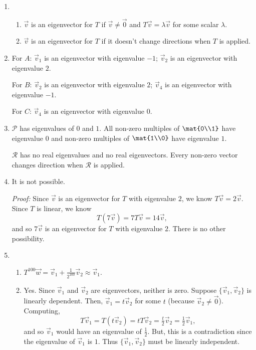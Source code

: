 		\begin{enumerate}
			\item \begin{enumerate}
					\item $\vec v$ is an eigenvector for $T$ if $\vec v\neq \vec 0$ and
						$T\vec v=\lambda \vec v$ for some scalar $\lambda$.
					\item $\vec v$ is an eigenvector for $T$ if it doesn't change directions
						when $T$ is applied.
			\end{enumerate}
			\item
				For $A$:
				$\vec v_1$ is an eigenvector with eigenvalue $-1$;
				$\vec v_2$ is an eigenvector with eigenvalue $2$.

				For $B$:
				$\vec v_2$ is an eigenvector with eigenvalue $2$;
				$\vec v_4$ is an eigenvector with eigenvalue $-1$.

				For $C$:
				$\vec v_4$ is an eigenvector with eigenvalue $0$.
			\item $\mathcal P$ has eigenvalues of $0$ and $1$. All non-zero multiples of $\mat{0\\1}$
				have eigenvalue $0$ and non-zero multiples of $\mat{1\\0}$ have eigenvalue $1$.

				$\mathcal R$ has no real eigenvalues and no real eigenvectors. Every non-zero
				vector changes direction when $\mathcal R$ is applied.
			\item It is not possible.

				\emph{Proof:} Since $\vec v$ is an eigenvector for $T$ with eigenvalue
				$2$, we know $T\vec v=2\vec v$. Since $T$ is linear, we know
				\[
					T(7\vec v)=7T\vec v=14\vec v,
				\]
				and so $7\vec v$ is an eigenvector for $T$ with eigenvalue $2$. There is no
				other possibility.
			\item \begin{enumerate}
				\item $T^{100}\vec w=\vec v_1+\tfrac{1}{2^{100}}\vec v_2 \approx \vec v_1$.
				\item Yes. Since $\vec v_1$ and $\vec v_2$ are eigenvectors, neither is zero.
				Suppose $\{\vec v_1,\vec v_2\}$ is linearly dependent. Then, $\vec v_1=t\vec v_2$
					for some $t$ (because $\vec v_2\neq \vec 0$). Computing,
					\[
						T\vec v_1=T(t\vec v_2)=tT\vec v_2=\tfrac{t}{2}\vec v_2 = \tfrac{1}{2}\vec v_1,
					\]
					and so $\vec v_1$ would have an eigenvalue of $\tfrac{1}{2}$. But, this
					is a contradiction since the eigenvalue
					of $\vec v_1$ is $1$. Thus $\{\vec v_1,\vec v_2\}$ must be linearly independent.


\end{enumerate}
\end{enumerate}
